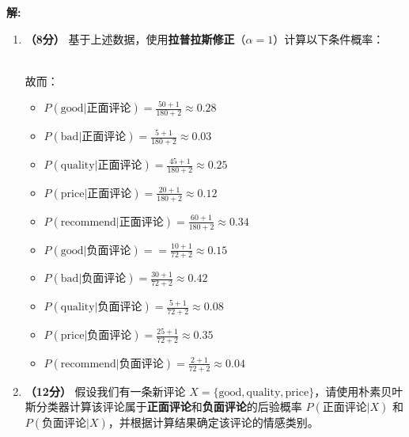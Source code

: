 \documentclass[8pt]{article}
\begin{document}
\textbf{\large 解:}

\begin{enumerate}
    \item \textbf{（8分）} 基于上述数据，使用\textbf{拉普拉斯修正}（\(\alpha = 1\)）计算以下条件概率：
    
     \\
    故而：
        \begin{itemize}
            \item \( 
                P(\text{good} | \text{正面评论}) 
                = \frac{50 + 1}{180 + 2} \approx 0.28
            \)
            \item \( P(\text{bad} | \text{正面评论}) 
                = \frac{5 + 1}{180 + 2} \approx 0.03
            \)
            \item \( P(\text{quality} | \text{正面评论}) 
                = \frac{45 + 1}{180 + 2} \approx 0.25
            \)
            \item \( P(\text{price} | \text{正面评论}) 
                = \frac{20 + 1}{180 + 2} \approx 0.12
            \)
            \item \( P(\text{recommend} | \text{正面评论}) 
                = \frac{60 + 1}{180 + 2} \approx 0.34
            \)
        \end{itemize}
        \begin{itemize}
            \item \( 
                P(\text{good} | \text{负面评论}) = 
                =  \frac{10 + 1}{72 + 2} \approx 0.15
            \)
            \item \( P(\text{bad} | \text{负面评论}) 
                =  \frac{30 + 1}{72 + 2} \approx 0.42
            \)
            \item \( P(\text{quality} | \text{负面评论}) 
                = \frac{5 + 1}{72 + 2} \approx 0.08
            \)
            \item \( P(\text{price} | \text{负面评论}) 
                = \frac{25 + 1}{72 + 2} \approx 0.35
            \)
            \item \( P(\text{recommend} | \text{负面评论}) 
                = \frac{2 + 1}{72 + 2} \approx 0.04
            \)
        \end{itemize}

    \item \textbf{（12分）} 假设我们有一条新评论 \( X = \{\text{good}, \text{quality}, \text{price}\} \)，请使用朴素贝叶斯分类器计算该评论属于\textbf{正面评论}和\textbf{负面评论}的后验概率 \( P(\text{正面评论} | X) \) 和 \( P(\text{负面评论} | X) \)，并根据计算结果确定该评论的情感类别。


\end{enumerate}
\end{document}
